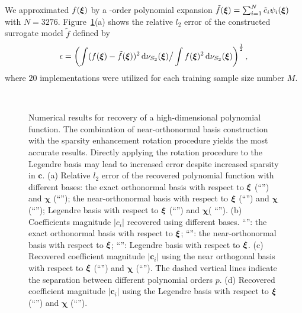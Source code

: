 We approximated $f(\bm\xi)$ by a -order polynomial expansion $\tilde{f}(\bm\xi) = \sum_{i=1}^N \tilde{c}_i\psi_i(\bm\xi)$ with $N = 3276$.
Figure~\ref{fig:err_rand_poly_dim_25}(a) shows the relative $l_2$ error of the constructed surrogate model $\tilde{f}$ defined by
\begin{equation}
  \epsilon = \left(\int(f(\bm\xi) - \tilde{f}(\bm\xi))^2 \,\mathrm{d} \nu_{S_2}(\bm\xi) \big/ \int f(\bm\xi)^2 \,\mathrm{d} \nu_{S_2}(\bm\xi) \right)^{\frac{1}{2}},
\end{equation}
where $20$ implementations were utilized for each training sample size number $M$.
\begin{figure}[htbp]
  \center
   \\
  \caption{Numerical results for recovery of a high-dimensional polynomial function. The combination of
  near-orthonormal basis construction with the sparsity enhancement rotation procedure yields 
  the most accurate results. Directly applying the rotation procedure to the Legendre basis 
  may lead to increased error despite increased sparsity in $\bm c$.
  (a) Relative $l_2$ error of the recovered polynomial function with different bases:
  the exact orthonormal  basis with respect to $\bm\xi$ (``\textcolor{red}{\protect\rectanglesolidline}'') and 
  $\bm\chi$ (``\textcolor{red}{\protect\rectangledashline}''); 
  the near-orthonormal  basis with respect to $\bm\xi$ (``\textcolor{green}{\protect\trianglesolidline}'') and
  $\bm\chi$ (``\textcolor{green}{\protect\triangledashline}'');
  Legendre basis with respect to $\bm\xi$ (``\textcolor{blue}{\protect\diamondsolidline}'') and 
  $\bm\chi$( ``\textcolor{blue}{\protect\diamonddashline}'').
  (b) Coefficients magnitude $\vert c_{i}\vert$ recovered using different bases. 
  ``\textcolor{red}{\protect\rectangleopen}'': the exact orthonormal  basis with respect to $\bm\xi$;  
  ``\textcolor{green}{\protect\triangleopen}'': the near-orthonormal  basis with respect to $\bm\xi$;  
  ``\textcolor{blue}{\protect\diamondopen}'': Legendre basis with respect to $\bm\xi$.
  (c) Recovered coefficient magnitude $\vert \mathbf{c}_{i}\vert $ using the near orthogonal basis with respect to $\bm\xi$ 
    (``\textcolor{green}{\protect\triangleopen}'') and $\bm\chi$ (``\textcolor{gray}{\protect\circleopen}'').
  The dashed vertical lines indicate the separation between different polynomial orders $p$.
  (d) Recovered coefficient magnitude $\vert \mathbf{c}_{i}\vert $ using the Legendre basis with respect to 
  $\bm\xi$ (``\textcolor{blue}{\protect\diamondopen}'') and $\bm\chi$ (``\textcolor{gray}{\protect\circleopen}'').} 
  \label{fig:err_rand_poly_dim_25}
\end{figure}
